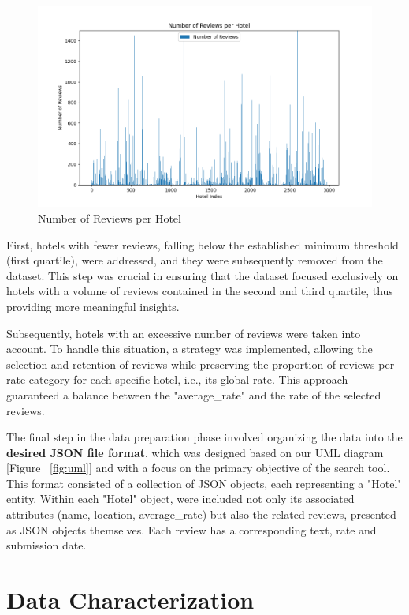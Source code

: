 \documentclass[sigconf]{acmart}
\begin{document}
\begin{figure}[H]
  \centering
  \includegraphics[width=\linewidth]{imgs/hotel_reviews_number.png}
  \caption{Number of Reviews per Hotel}
  \label{fig:reviewsHotel}
\end{figure}

First, hotels with fewer reviews, falling below the established minimum threshold (first quartile), were addressed, and they were subsequently removed from the dataset. This step was crucial in ensuring that the dataset focused exclusively on hotels with a volume of reviews contained in the second and third quartile, thus providing more meaningful insights.

Subsequently, hotels with an excessive number of reviews were taken into account. To handle this situation, a strategy was implemented, allowing the selection and retention of reviews while preserving the proportion of reviews per rate category for each specific hotel, i.e., its global rate. This approach guaranteed a balance between the "average\_rate" and the rate of the selected reviews.

The final step in the data preparation phase involved organizing the data into the \textbf{desired JSON file format}, which was designed based on our UML diagram [Figure ~\ref{fig:uml}] and with a focus on the primary objective of the search tool. This format consisted of a collection of JSON objects, each representing a "Hotel" entity. Within each "Hotel" object, were included not only its associated attributes (name, location, average\_rate) but also the related reviews, presented as JSON objects themselves. Each review has a corresponding text, rate and submission date.

\section{Data Characterization}
\end{document}
